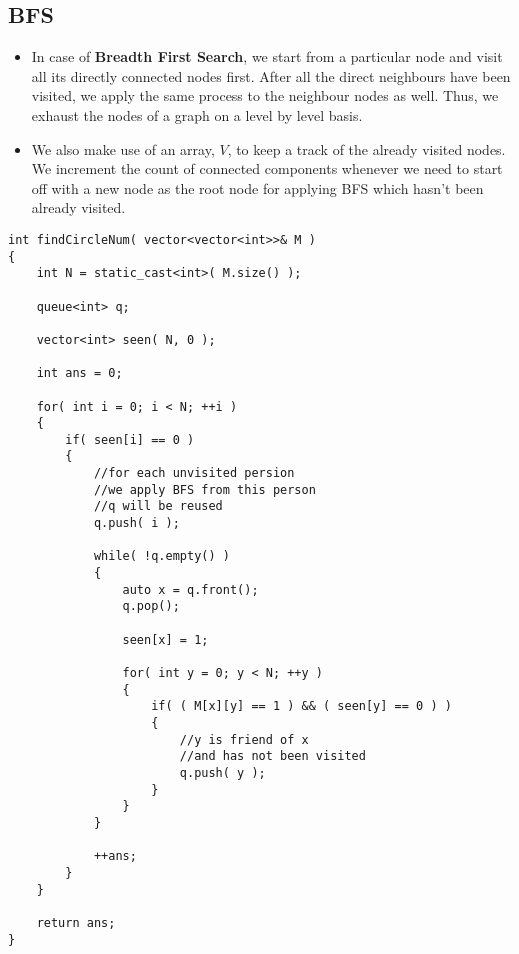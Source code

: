 \subsection{BFS}
\begin{itemize}
\item In case of \textbf{Breadth First Search}, we start from a particular node and visit all its directly connected nodes first. After all the direct neighbours have been visited, we apply the same process to the neighbour nodes as well. Thus, we exhaust the nodes of a graph on a level by level basis.
\item We also make use of an array, $V$, to keep a track of the already visited nodes. We increment the count of connected components whenever we need to start off with a new node as the root node for applying BFS which hasn't been already visited.
\end{itemize}

\setcounter{lstlisting}{0}
\begin{lstlisting}[style=customc, caption={BFS}]
int findCircleNum( vector<vector<int>>& M )
{
    int N = static_cast<int>( M.size() );

    queue<int> q;

    vector<int> seen( N, 0 );

    int ans = 0;

    for( int i = 0; i < N; ++i )
    {
        if( seen[i] == 0 )
        {
            //for each unvisited persion
            //we apply BFS from this person
            //q will be reused
            q.push( i );

            while( !q.empty() )
            {
                auto x = q.front();
                q.pop();

                seen[x] = 1;

                for( int y = 0; y < N; ++y )
                {
                    if( ( M[x][y] == 1 ) && ( seen[y] == 0 ) )
                    {
                        //y is friend of x
                        //and has not been visited
                        q.push( y );
                    }
                }
            }

            ++ans;
        }
    }

    return ans;
}
\end{lstlisting}

